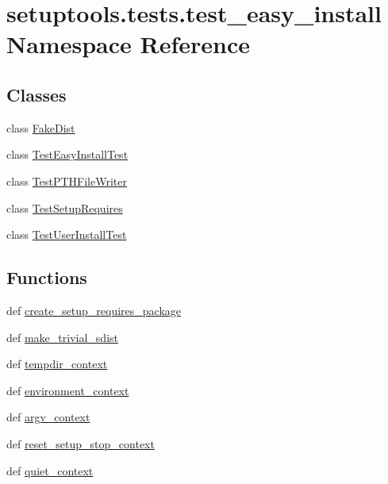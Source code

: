 \hypertarget{namespacesetuptools_1_1tests_1_1test__easy__install}{}\section{setuptools.\+tests.\+test\+\_\+easy\+\_\+install Namespace Reference}
\label{namespacesetuptools_1_1tests_1_1test__easy__install}
\subsection*{Classes}
\begin{DoxyCompactItemize}
\item 
class \hyperlink{classsetuptools_1_1tests_1_1test__easy__install_1_1FakeDist}{Fake\+Dist}
\item 
class \hyperlink{classsetuptools_1_1tests_1_1test__easy__install_1_1TestEasyInstallTest}{Test\+Easy\+Install\+Test}
\item 
class \hyperlink{classsetuptools_1_1tests_1_1test__easy__install_1_1TestPTHFileWriter}{Test\+P\+T\+H\+File\+Writer}
\item 
class \hyperlink{classsetuptools_1_1tests_1_1test__easy__install_1_1TestSetupRequires}{Test\+Setup\+Requires}
\item 
class \hyperlink{classsetuptools_1_1tests_1_1test__easy__install_1_1TestUserInstallTest}{Test\+User\+Install\+Test}
\end{DoxyCompactItemize}
\subsection*{Functions}
\begin{DoxyCompactItemize}
\item 
def \hyperlink{namespacesetuptools_1_1tests_1_1test__easy__install_a1cdf474624bc8dbf8fe77f4c8f962c23}{create\+\_\+setup\+\_\+requires\+\_\+package}
\item 
def \hyperlink{namespacesetuptools_1_1tests_1_1test__easy__install_a4a1e0446d0e4d15951a1df8ce4de0718}{make\+\_\+trivial\+\_\+sdist}
\item 
def \hyperlink{namespacesetuptools_1_1tests_1_1test__easy__install_a1d03050d094fc475119870028f5266bc}{tempdir\+\_\+context}
\item 
def \hyperlink{namespacesetuptools_1_1tests_1_1test__easy__install_a67347cd6cd858d5803e0d3f567d5223f}{environment\+\_\+context}
\item 
def \hyperlink{namespacesetuptools_1_1tests_1_1test__easy__install_ade7f5c400f7d39d6b6d9db88478ba687}{argv\+\_\+context}
\item 
def \hyperlink{namespacesetuptools_1_1tests_1_1test__easy__install_a1e448bed17e2c1605b716a3722a4e579}{reset\+\_\+setup\+\_\+stop\+\_\+context}
\item 
def \hyperlink{namespacesetuptools_1_1tests_1_1test__easy__install_a07d89f5ecd90a0b899ba857b3f42a31d}{quiet\+\_\+context}
\end{DoxyCompactItemize}
